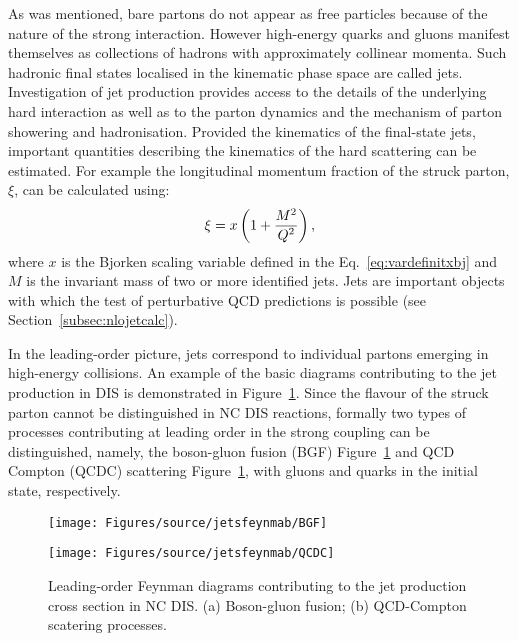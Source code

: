 As was mentioned, bare partons do not appear as free particles because of the nature of the strong interaction. However high-energy quarks and gluons manifest themselves as collections of hadrons with approximately collinear momenta. Such hadronic final states localised in the kinematic phase space are called jets. Investigation of jet production provides access to the details of the underlying hard interaction as well as to the parton dynamics and the mechanism of parton showering and hadronisation. Provided the kinematics of the final-state jets, important quantities describing the kinematics of the hard scattering can be estimated. For example the longitudinal momentum fraction of the struck parton, $\xi$, can be calculated using:
\begin{equation}
\xi = x\left(1+\frac{M^2}{\mbox{${Q^2}$}}\right),
\label{eq:xidef}
\end{equation}
where $x$ is the Bjorken scaling variable defined in the Eq.~\eqref{eq:vardefinitxbj} and $M$ is the invariant mass of two or more identified jets. Jets are important objects with which the test of perturbative QCD predictions is possible (see Section~\ref{subsec:nlojetcalc}).

In the leading-order picture, jets correspond to individual partons emerging in high-energy collisions. An example of the basic diagrams contributing to the jet production in DIS is demonstrated in Figure~\ref{fig:LOFeynmandiags}. Since the flavour of the struck parton cannot be distinguished in NC DIS reactions, formally two types of processes contributing at leading order in the strong coupling can be distinguished, namely, the boson-gluon fusion (BGF) Figure~\ref{fig:LOFeynmandiags} and QCD Compton (QCDC) scattering Figure~\ref{fig:LOFeynmandiags}, with gluons and quarks in the initial state, respectively.
\begin{figure}
	\centering
	\begin{subfloat}[]{
		\texttt{[image: Figures/source/jetsfeynmab/BGF]}
		\label{subfig:lobgf}
		}%
		\end{subfloat}
		\begin{subfloat}[]{
		\texttt{[image: Figures/source/jetsfeynmab/QCDC]}
		\label{subfig:loqcdc}
		}%
		\end{subfloat}
	\caption{Leading-order Feynman diagrams contributing to the jet production cross section in NC DIS. (a) Boson-gluon fusion; (b) QCD-Compton scatering processes.}
	\label{fig:LOFeynmandiags}
\end{figure}

